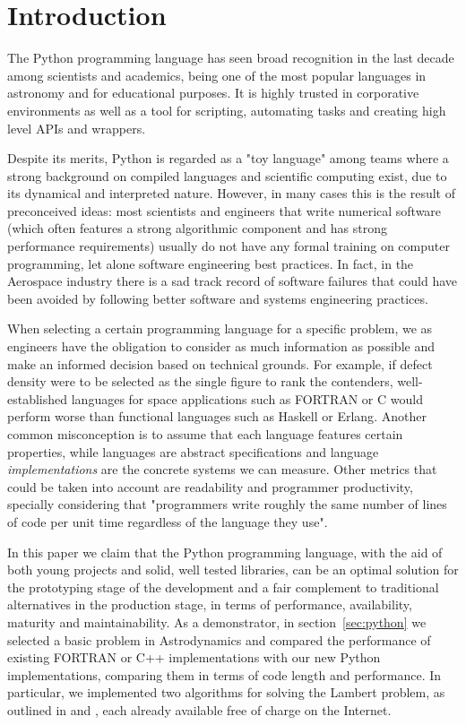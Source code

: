 \section{Introduction}
\label{sec:intro}

The Python programming language has seen broad recognition in the last decade among scientists and academics, being one of the most popular languages in astronomy\citep{Robitaille2013} and for educational purposes\citep{guo2014python}. It is highly trusted in corporative environments as well as a tool for scripting, automating tasks and creating high level APIs and wrappers.

Despite its merits, Python is regarded as a "toy language" among teams where a strong background on compiled languages and scientific computing exist, due to its dynamical and interpreted nature. However, in many cases this is the result of preconceived ideas: most scientists and engineers that write numerical software (which often features a strong algorithmic component and has strong performance requirements) usually do not have any formal training on computer programming, let alone software engineering best practices\citep{Wilson2014}. In fact, in the Aerospace industry there is a sad track record of software failures\citep{albee2000report,lions1996report} that could have been avoided by following better software and systems engineering practices.

When selecting a certain programming language for a specific problem, we as engineers have the obligation to consider as much information as possible and make an informed decision based on technical grounds. For example, if defect density were to be selected as the single figure to rank the contenders, well-established languages for space applications such as FORTRAN or C would perform worse than functional languages such as Haskell or Erlang\citep{Ray2014}. Another common misconception is to assume that each language features certain properties, while languages are abstract specifications and language \textit{implementations} are the concrete systems we can measure. Other metrics that could be taken into account are readability and programmer productivity, specially considering that "programmers write roughly the same number of lines of code per unit time regardless of the language they use"\citep{Wilson2014}.

In this paper we claim that the Python programming language, with the aid of both young projects and solid, well tested libraries, can be an optimal solution for the prototyping stage of the development and a fair complement to traditional alternatives in the production stage, in terms of performance, availability, maturity and maintainability. As a demonstrator, in section~\ref{sec:python} we selected a basic problem in Astrodynamics and compared the performance of existing FORTRAN or C++ implementations with our new Python implementations, comparing them in terms of code length and performance. In particular, we implemented two algorithms for solving the Lambert problem, as outlined in \citep{vallado2001fundamentals} and \citep{Izzo2014}, each already available free of charge on the Internet.

